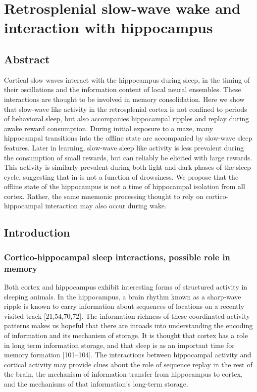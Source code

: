 \documentclass[]{article}
\let\stdsection\section
\renewcommand\section{\newpage\stdsection}
\begin{document}
\section{Retrosplenial slow-wave wake and interaction with hippocampus}

\subsection{Abstract}

Cortical slow waves interact with the hippocampus during sleep, in the
timing of their oscillations and the information content of local neural
ensembles. These interactions are thought to be involved in memory
consolidation. Here we show that slow-wave like activity in the
retrosplenial cortex is not confined to periods of behavioral sleep, but
also accompanies hippocampal ripples and replay during awake reward
consumption. During initial exposure to a maze, many hippocampal
transitions into the offline state are accompanied by slow-wave sleep
features. Later in learning, slow-wave sleep like activity is less
prevalent during the consumption of small rewards, but can reliably be
elicited with large rewards. This activity is similarly prevalent during
both light and dark phases of the sleep cycle, suggesting that in is not
a function of drowsiness. We propose that the offline state of the
hippocampus is not a time of hippocampal isolation from all cortex.
Rather, the same mnemonic processing thought to rely on
cortico-hippocampal interaction may also occur during wake.

\subsection{Introduction}

\subsubsection{Cortico-hippocampal sleep interactions, possible role in
memory}

Both cortex and hippocampus exhibit interesting forms of structured
activity in sleeping animals. In the hippocampus, a brain rhythm known
as a sharp-wave ripple is known to carry information about sequences of
locations on a recently visited track {[}21,54,70,72{]}. The
information-richness of these coordinated activity patterns makes us
hopeful that there are inroads into understanding the encoding of
information and its mechanism of storage. It is thought that cortex has
a role in long term information storage, and that sleep is as an
important time for memory formation {[}101--104{]}. The interactions
between hippocampal activity and cortical activity may provide clues
about the role of sequence replay in the rest of the brain, the
mechanism of information transfer from hippocampus to cortex, and the
mechanisms of that information's long-term storage.
\end{document}
